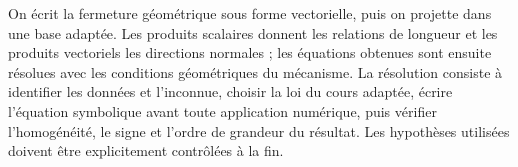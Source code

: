 \begin{corrigebox}[Corrigé]
On écrit la fermeture géométrique sous forme vectorielle, puis on projette dans une base adaptée. Les produits scalaires donnent les relations de longueur et les produits vectoriels les directions normales ; les équations obtenues sont ensuite résolues avec les conditions géométriques du mécanisme.
La résolution consiste à identifier les données et l'inconnue, choisir la loi du cours adaptée, écrire l'équation symbolique avant toute application numérique, puis vérifier l'homogénéité, le signe et l'ordre de grandeur du résultat. Les hypothèses utilisées doivent être explicitement contrôlées à la fin.
\end{corrigebox}
